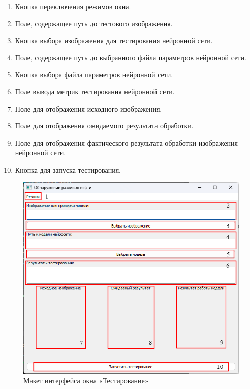 \begin{enumerate}
	\item Кнопка переключения режимов окна.
	\item Поле, содержащее путь до тестового изображения.
	\item Кнопка выбора изображения для тестирования нейронной сети.
	\item Поле, содержащее путь до выбранного файла параметров нейронной сети.
	\item Кнопка выбора файла параметров нейронной сети.
	\item Поле вывода метрик тестирования нейронной сети.
	\item Поле для отображения исходного изображения.
	\item Поле для отображения ожидаемого результата обработки.
	\item Поле для отображения фактического результата обработки изображения нейронной сети.
	\item Кнопка для запуска тестирования.
\end{enumerate}

\begin{figure}[H]
	\centering
	\includegraphics[width=1\linewidth]{images/ui_test}
	\caption{Макет интерфейса окна «Тестирование»}
	\label{fig:uitest}
\end{figure}

\newpage